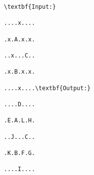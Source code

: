 \begin{verbatim}
\textbf{Input:}

....x....

.x.A.x.x.

..x...C..

.x.B.x.x.

....x....\textbf{Output:}

....D....

.E.A.L.H.

..J...C..

.K.B.F.G.

....I....\end{verbatim}